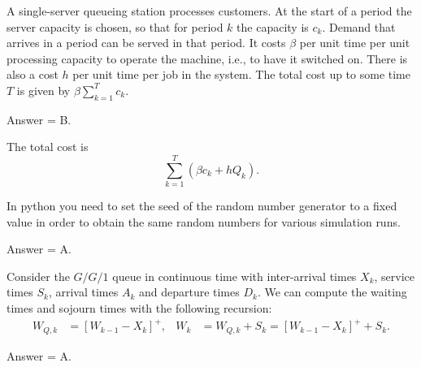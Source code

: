\begin{exercise}[201903]
  A single-server queueing station processes customers.
  At the start of a period the server capacity is chosen, so that for period $k$ the capacity is $c_k$.
  Demand that arrives in a period can be served in that period.
  It costs $\beta$ per unit time per unit processing capacity to operate the machine, i.e., to have it switched on.
  There is also a cost $h$ per unit time per job in the system.
  The total cost up to some time $T$ is given by  $\beta \sum_{k=1}^T c_k$.
\begin{solution}
Answer = B.

The total cost is
    \begin{equation*}
      \sum_{k=1}^T \left(\beta c_k + h Q_k\right).
    \end{equation*}

\end{solution}
\end{exercise}

\begin{exercise}[201903]
In python you need to set the seed of the random number generator to a fixed value in order to obtain the same random numbers for various simulation runs. 
\begin{solution}
Answer = A.
\end{solution}
\end{exercise}

\begin{exercise}[201903]
Consider the $G/G/1$ queue in continuous time with inter-arrival times $X_k$, service times $S_k$, arrival times $A_k$ and departure times $D_k$. We can compute the waiting times and sojourn times with the following recursion:
\begin{align}
  W_{Q,k} &= [W_{k-1} - X_k]^+, &
  W_{k} &= W_{Q,k} + S_k = [W_{k-1} - X_k]^+ + S_k.
\end{align}

\begin{solution}
Answer = A.
\end{solution}
\end{exercise}



